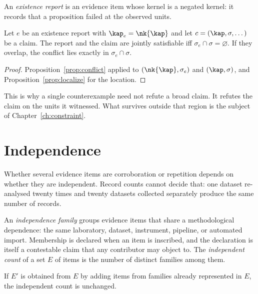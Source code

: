 An \emph{existence report} is an evidence item whose kernel is a negated kernel: it records that a proposition failed at the observed units.

\begin{proposition}\label{prop:counterexample}
Let $e$ be an existence report with $\kap_e=\nk{\kap}$ and let $c=(\kap,\sigma,\dots)$ be a claim. The report and the claim are jointly satisfiable iff $\sigma_e\cap\sigma=\varnothing$. If they overlap, the conflict lies exactly in $\sigma_e\cap\sigma$.
\end{proposition}

\begin{proof}
Proposition~\ref{prop:conflict} applied to $(\nk{\kap},\sigma_e)$ and $(\kap,\sigma)$, and Proposition~\ref{prop:localize} for the location.
\end{proof}

This is why a single counterexample need not refute a broad claim. It refutes the claim on the units it witnessed. What survives outside that region is the subject of Chapter~\ref{ch:constraint}.

\section{Independence}\label{sec:independence}

Whether several evidence items are corroboration or repetition depends on whether they are independent. Record counts cannot decide that: one dataset re-analysed twenty times and twenty datasets collected separately produce the same number of records.

\begin{definition}
An \emph{independence family} groups evidence items that share a methodological dependence: the same laboratory, dataset, instrument, pipeline, or automated import. Membership is declared when an item is inscribed, and the declaration is itself a contestable claim that any contributor may object to. The \emph{independent count} of a set $E$ of items is the number of distinct families among them.
\end{definition}

\begin{proposition}\label{prop:indep}
If $E'$ is obtained from $E$ by adding items from families already represented in $E$, the independent count is unchanged.
\end{proposition}

